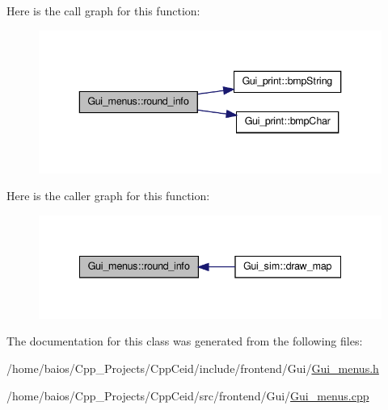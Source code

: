 Here is the call graph for this function\-:\nopagebreak
\begin{figure}[H]
\begin{center}
\leavevmode
\includegraphics[width=340pt]{class_gui__menus_a36b5bf60d6fb755a34ab7acb100ffac6_cgraph}
\end{center}
\end{figure}




Here is the caller graph for this function\-:\nopagebreak
\begin{figure}[H]
\begin{center}
\leavevmode
\includegraphics[width=338pt]{class_gui__menus_a36b5bf60d6fb755a34ab7acb100ffac6_icgraph}
\end{center}
\end{figure}




The documentation for this class was generated from the following files\-:\begin{DoxyCompactItemize}
\item 
/home/baios/\-Cpp\-\_\-\-Projects/\-Cpp\-Ceid/include/frontend/\-Gui/\hyperlink{_gui__menus_8h}{Gui\-\_\-menus.\-h}\item 
/home/baios/\-Cpp\-\_\-\-Projects/\-Cpp\-Ceid/src/frontend/\-Gui/\hyperlink{_gui__menus_8cpp}{Gui\-\_\-menus.\-cpp}\end{DoxyCompactItemize}
